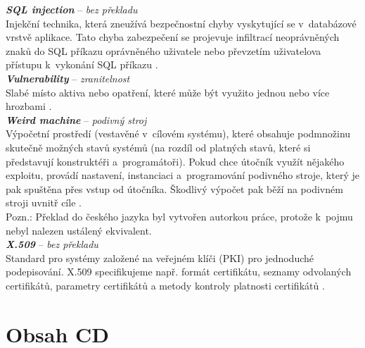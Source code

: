 \textit{\textbf{SQL injection}} -- \textit{bez překladu} \label{app:a:sqlinjection} \\
Injekční technika, která zneužívá bezpečnostní chyby vyskytující se v~databázové vrstvě aplikace.
Tato chyba zabezpečení se projevuje infiltrací neoprávněných znaků do SQL příkazu oprávněného uživatele nebo převzetím uživatelova přístupu k~vykonání SQL příkazu \cite[str. 111]{Slovnik2015}. \\

\textit{\textbf{Vulnerability}} -- \textit{zranitelnost} \label{app:a:vulnerability} \\ %
Slabé místo aktiva nebo opatření, které může být využito jednou nebo více hrozbami \cite[str. 136]{Slovnik2015}. \\

\textit{\textbf{Weird machine}} -- \textit{podivný stroj} \label{app:a:weirdmachine} \\
Výpočetní prostředí (vestavěné v~cílovém systému), které obsahuje podmnožinu skutečně možných stavů systémů (na rozdíl od platných stavů, které si představují konstruktéři a~programátoři). Pokud chce útočník využít nějakého exploitu, provádí nastavení, instanciaci a~programování podivného stroje, který je pak spuštěna přes vstup od útočníka. Škodlivý výpočet pak běží na podivném stroji uvnitř cíle \cite[str. 20]{Sass2011}. \\
Pozn.: Překlad do českého jazyka byl vytvořen autorkou práce, protože k~pojmu nebyl \mbox{nalezen} ustálený ekvivalent. \\

\textit{\textbf{X.509}} -- \textit{bez překladu} \label{app:a:x.509} \\ %
Standard pro systémy založené na veřejném klíči (PKI) pro jednoduché podepisování. X.509 specifikujeme např. formát certifikátu, seznamy odvolaných certifikátů, 
parametry \mbox{certifikátů} a metody kontroly platnosti certifikátů \cite[str. 130]{Slovnik2015}. \\

\chapter{Obsah CD} \label{app:cd}

